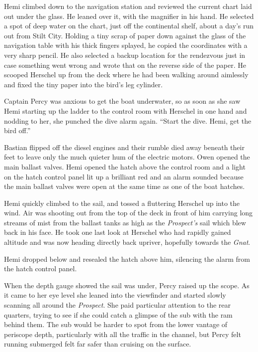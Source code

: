 \documentclass[]{scrbook}
\begin{document}
Hemi climbed down to the navigation station and reviewed the current
chart laid out under the glass. He leaned over it, with the magnifier in
his hand. He selected a spot of deep water on the chart, just off the
continental shelf, about a day's run out from Stilt City. Holding a tiny
scrap of paper down against the glass of the navigation table with his
thick fingers splayed, he copied the coordinates with a very sharp
pencil. He also selected a backup location for the rendezvous just in
case something went wrong and wrote that on the reverse side of the
paper. He scooped Herschel up from the deck where he had been walking
around aimlessly and fixed the tiny paper into the bird's leg cylinder.

Captain Percy was anxious to get the boat underwater, so as soon as she
saw Hemi starting up the ladder to the control room with Herschel in one
hand and nodding to her, she punched the dive alarm again. ``Start the
dive. Hemi, get the bird off.''

Bastian flipped off the diesel engines and their rumble died away
beneath their feet to leave only the much quieter hum of the electric
motors. Owen opened the main ballast valves. Hemi opened the hatch above
the control room and a light on the hatch control panel lit up a
brilliant red and an alarm sounded because the main ballast valves were
open at the same time as one of the boat hatches.

Hemi quickly climbed to the sail, and tossed a fluttering Herschel up
into the wind. Air was shooting out from the top of the deck in front of
him carrying long streams of mist from the ballast tanks as high as the
\emph{Prospect's} sail which blew back in his face. He took one last
look at Herschel who had rapidly gained altitude and was now heading
directly back upriver, hopefully towards the \emph{Gnat}.

Hemi dropped below and resealed the hatch above him, silencing the alarm
from the hatch control panel.

When the depth gauge showed the sail was under, Percy raised up the
scope. As it came to her eye level she leaned into the viewfinder and
started slowly scanning all around the \emph{Prospect}. She paid
particular attention to the rear quarters, trying to see if she could
catch a glimpse of the sub with the ram behind them. The sub would be
harder to spot from the lower vantage of periscope depth, particularly
with all the traffic in the channel, but Percy felt running submerged
felt far safer than cruising on the surface.
\end{document}
